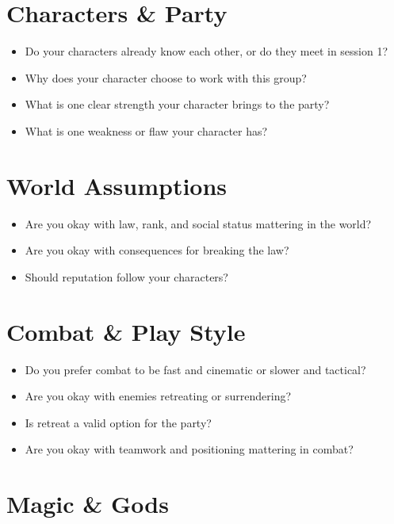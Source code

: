 \documentclass[
]{book}
\providecommand{\tightlist}{%
  \setlength{\itemsep}{0pt}\setlength{\parskip}{0pt}}
\begin{document}
\section{Characters \& Party}\label{characters-party}

\begin{itemize}
\tightlist
\item
  Do your characters already know each other, or do they meet in session
  1?
\item
  Why does your character choose to work with this group?
\item
  What is one clear strength your character brings to the party?
\item
  What is one weakness or flaw your character has?
\end{itemize}

\section{World Assumptions}\label{world-assumptions}

\begin{itemize}
\tightlist
\item
  Are you okay with law, rank, and social status mattering in the world?
\item
  Are you okay with consequences for breaking the law?
\item
  Should reputation follow your characters?
\end{itemize}

\section{Combat \& Play Style}\label{combat-play-style}

\begin{itemize}
\tightlist
\item
  Do you prefer combat to be fast and cinematic or slower and tactical?
\item
  Are you okay with enemies retreating or surrendering?
\item
  Is retreat a valid option for the party?
\item
  Are you okay with teamwork and positioning mattering in combat?
\end{itemize}

\section{Magic \& Gods}\label{magic-gods}
\end{document}
